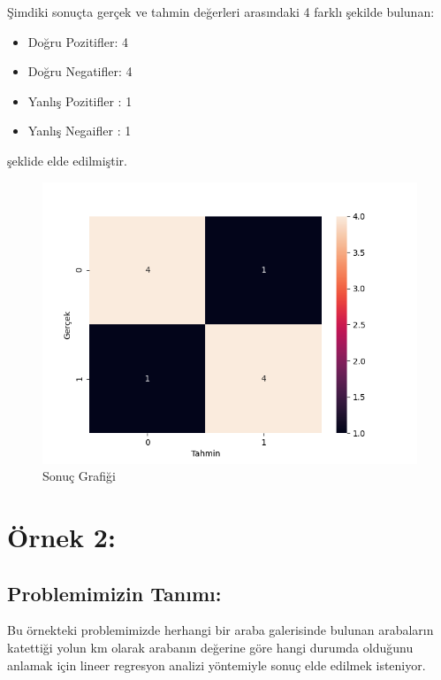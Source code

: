 \documentclass{article}
\begin{document}
Şimdiki sonuçta gerçek ve tahmin  değerleri arasındaki 4 farklı şekilde bulunan:
\begin{itemize}
    \item Doğru Pozitifler: 4
    \item Doğru Negatifler: 4
    \item Yanlış Pozitifler : 1
    \item Yanlış Negaifler : 1
\end{itemize}

şeklide elde edilmiştir.

\begin{figure}[htp]
    \centering
    \includegraphics{sonuç_grafiği.png}
    \caption{Sonuç Grafiği}
    \label{fig:my_label}
\end{figure}

\newpage

\section{Örnek 2:}

\subsection{Problemimizin Tanımı:}

\hspace{1cm}Bu örnekteki problemimizde herhangi bir araba galerisinde bulunan arabaların katettiği yolun km olarak arabanın değerine göre hangi durumda olduğunu anlamak için lineer regresyon analizi yöntemiyle sonuç elde edilmek isteniyor.
\end{document}
